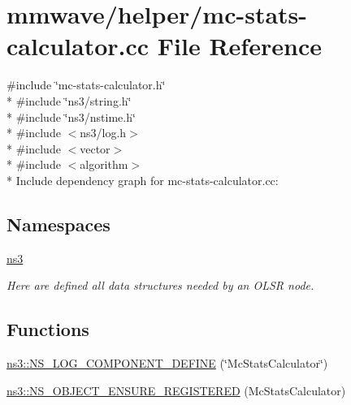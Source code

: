 \hypertarget{mc-stats-calculator_8cc}{}\section{mmwave/helper/mc-\/stats-\/calculator.cc File Reference}
\label{mc-stats-calculator_8cc}
{\ttfamily \#include \char`\"{}mc-\/stats-\/calculator.\+h\char`\"{}}\\*
{\ttfamily \#include \char`\"{}ns3/string.\+h\char`\"{}}\\*
{\ttfamily \#include \char`\"{}ns3/nstime.\+h\char`\"{}}\\*
{\ttfamily \#include $<$ns3/log.\+h$>$}\\*
{\ttfamily \#include $<$vector$>$}\\*
{\ttfamily \#include $<$algorithm$>$}\\*
Include dependency graph for mc-\/stats-\/calculator.cc\+:
\subsection*{Namespaces}
\begin{DoxyCompactItemize}
\item 
 \hyperlink{namespacens3}{ns3}
\begin{DoxyCompactList}\small\item\em Here are defined all data structures needed by an O\+L\+SR node. \end{DoxyCompactList}\end{DoxyCompactItemize}
\subsection*{Functions}
\begin{DoxyCompactItemize}
\item 
\hyperlink{namespacens3_a8a9f0fcb2f23e73c803980fec587ba66}{ns3\+::\+N\+S\+\_\+\+L\+O\+G\+\_\+\+C\+O\+M\+P\+O\+N\+E\+N\+T\+\_\+\+D\+E\+F\+I\+NE} (\char`\"{}Mc\+Stats\+Calculator\char`\"{})
\item 
\hyperlink{namespacens3_ae4567b72475a8952a203ba1d50f4662a}{ns3\+::\+N\+S\+\_\+\+O\+B\+J\+E\+C\+T\+\_\+\+E\+N\+S\+U\+R\+E\+\_\+\+R\+E\+G\+I\+S\+T\+E\+R\+ED} (Mc\+Stats\+Calculator)
\end{DoxyCompactItemize}
